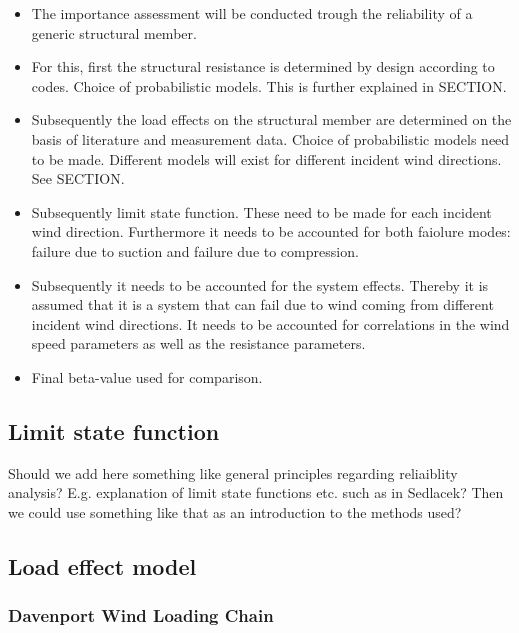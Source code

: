 \begin{itemize}
\item
The importance assessment will be conducted trough the reliability of a generic structural member. 

\item
For this, first the structural resistance is determined by design according to codes. Choice of probabilistic models. This is further explained in SECTION. 

\item
Subsequently the load effects on the structural member are determined on the basis of literature and measurement data. Choice of probabilistic models need to be made. Different models will exist for different incident wind directions. See SECTION. 

\item 
Subsequently limit state function. These need to be made for each incident wind direction.  Furthermore it needs to be accounted for both faiolure modes: failure due to suction and failure due to compression. 

\item 
Subsequently it needs to be accounted for the system effects. Thereby it is assumed that it is a system that can fail due to wind coming from different incident wind directions. It needs to be accounted for correlations in the wind speed parameters as well as the resistance parameters.

\item 
Final beta-value used for comparison. 

\end{itemize}


\subsection{Limit state function}
\begin{framed}
Should we add here something like general principles regarding reliaiblity analysis? E.g. explanation of limit state functions etc. such as in Sedlacek? Then we could use something like that as an introduction to the methods used?
\end{framed}

\subsection{Load effect model}

\subsubsection{Davenport Wind Loading Chain}





